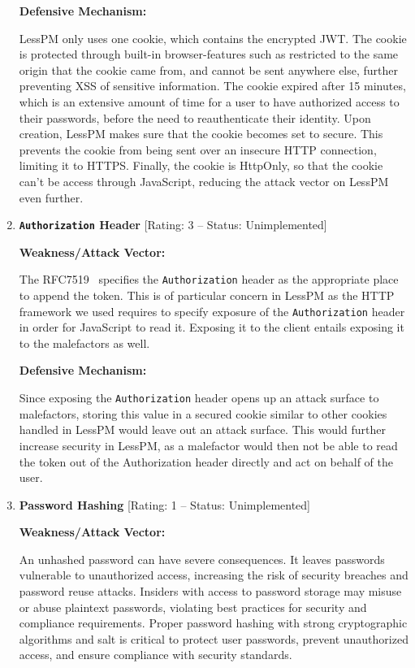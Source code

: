 \begin{enumerate}[label=$\blacktriangleright$]
  \textbf{Defensive Mechanism:}

  LessPM only uses one cookie, which contains the encrypted JWT\@.
  The cookie is protected through built-in browser-features such as
  restricted to the same origin that the cookie came from, and cannot be sent
  anywhere else, further preventing XSS of sensitive information\@.
  The cookie expired after 15 minutes, which is an extensive amount of time
  for a user to have authorized access to their passwords, before the need to
  reauthenticate their identity.
  Upon creation, LessPM makes sure that the cookie becomes set to secure.
  This prevents the cookie from being sent over an insecure HTTP connection,
  limiting it to HTTPS\@.
  Finally, the cookie is HttpOnly, so that the cookie can't be access through
  JavaScript, reducing the attack vector on LessPM even further.

  \item \textbf{\texttt{Authorization} Header}
  [Rating: 3 -- Status: Unimplemented]
  
  \textbf{Weakness/Attack Vector:}

  The RFC7519~\cite{RFC7519} specifies the \texttt{Authorization} header as
  the appropriate place to append the token.
  This is of particular concern in LessPM as the HTTP framework we used requires
  to specify exposure of the \texttt{Authorization} header in order for
  JavaScript to read it.
  Exposing it to the client entails exposing it to the malefactors as well.

  \textbf{Defensive Mechanism:}

  Since exposing the \texttt{Authorization} header opens up an attack surface
  to malefactors, storing this value in a secured cookie similar to other
  cookies handled in LessPM would leave out an attack surface.
  This would further increase security in LessPM, as a malefactor would then
  not be able to read the token out of the Authorization header directly and
  act on behalf of the user.

  \item \textbf{Password Hashing} [Rating: 1 -- Status: Unimplemented]

  \textbf{Weakness/Attack Vector:}

  An unhashed password can have severe consequences.
  It leaves passwords vulnerable to unauthorized access, increasing the risk of
  security breaches and password reuse attacks.
  Insiders with access to password storage may misuse or abuse plaintext
  passwords, violating best practices for security and compliance requirements.
  Proper password hashing with strong cryptographic algorithms and salt is
  critical to protect user passwords, prevent unauthorized access, and ensure
  compliance with security standards.


\end{enumerate}
